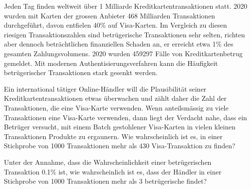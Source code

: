 Jeden Tag finden weltweit über 1 Milliarde Kreditkartentransaktionen
statt.
2020 wurden mit Karten der grossen Anbieter 468 Milliarden 
Transaktionen durchgeführt, davon entfielen 40\% auf Visa-Karten.
Im Vergleich zu diesen riesigen Transaktionszahlen sind betrügerische
Transaktionen sehr selten, richten aber dennoch beträchtlichen
finanziellen Schaden an, er erreicht etwa 1\% des gesamten
Zahlungsvolumens.
2020 wurden 459297 Fälle von Kreditkartenbetrug gemeldet.
Mit modernen Authentisierungsverfahren kann die Häufigkeit
betrügerischer Transaktionen stark gesenkt werden.
\begin{teilaufgaben}
\item 
Ein international tätiger Online-Händler will die Plausibilität
seiner Kreditkartentransaktionen etwas überwachen und zählt daher die 
Zahl der Transaktionen, die eine Visa-Karte verwenden.
Wenn anteilsmässig zu viele Transaktionen eine Visa-Karte verwenden,
dann liegt der Verdacht nahe, dass ein Betrüger versucht, mit einem
Batch gestohlener Visa-Karten in vielen kleinen Transaktionen Produkte
zu ergaunern.
Wie wahrscheinlich ist es, in einer Stichprobe von 1000 Transaktionen
mehr als 430 Visa-Transaktion zu finden?
\item
Unter der Annahme, dass die Wahrscheinlichkeit einer betrügerischen
Transaktion 0.1\% ist, wie wahrscheinlich ist es, dass der Händler
in einer Stichprobe von 1000 Transaktionen mehr als 3 betrügerische
findet?
\end{teilaufgaben}

